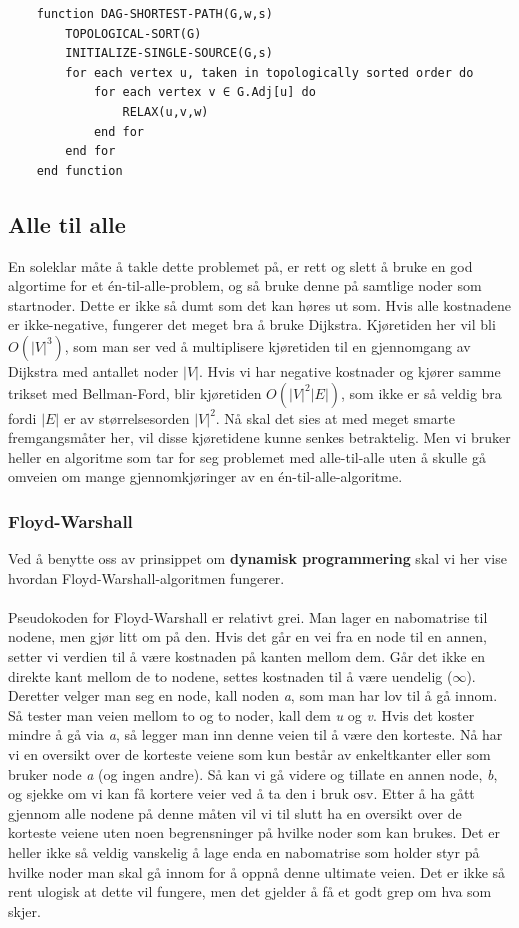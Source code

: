 \begin{lstlisting}
    function DAG-SHORTEST-PATH(G,w,s)
    	TOPOLOGICAL-SORT(G)
    	INITIALIZE-SINGLE-SOURCE(G,s)
    	for each vertex u, taken in topologically sorted order do
    		for each vertex v ∈ G.Adj[u] do
    			RELAX(u,v,w)
    		end for
    	end for
    end function

\end{lstlisting}

\subsection{Alle til alle}
En soleklar måte å takle dette problemet på, er rett og slett å bruke en god algortime for et én-til-alle-problem, og så bruke denne på samtlige noder som startnoder. Dette er ikke så dumt som det kan høres ut som. Hvis alle kostnadene er ikke-negative, fungerer det meget bra å bruke Dijkstra. Kjøretiden her vil bli $O(|V|^3)$, som man ser ved å multiplisere kjøretiden til en gjennomgang av Dijkstra med antallet noder $|V|$. Hvis vi har negative kostnader og kjører samme trikset med Bellman-Ford, blir kjøretiden $O(|V|^2 |E|)$, som ikke er så veldig bra fordi $|E|$ er av størrelsesorden $|V|^2$. Nå skal det sies at med meget smarte fremgangsmåter her, vil disse kjøretidene kunne senkes betraktelig. Men vi bruker heller en algoritme som tar for seg problemet med alle-til-alle uten å skulle gå omveien om mange gjennomkjøringer av en én-til-alle-algoritme.

\subsubsection{Floyd-Warshall}
Ved å benytte oss av prinsippet om \textbf{dynamisk programmering} skal vi her vise hvordan Floyd-Warshall-algoritmen fungerer.
\\\\
Pseudokoden for Floyd-Warshall er relativt grei. Man lager en nabomatrise til nodene, men gjør litt om på den. Hvis det går en vei fra en node til en annen, setter vi verdien til å være kostnaden på kanten mellom dem. Går det ikke en direkte kant mellom de to nodene, settes kostnaden til å være uendelig ($\infty$). Deretter velger man seg en node, kall noden \textit{a}, som man har lov til å gå innom. Så tester man veien mellom to og to noder, kall dem \textit{u} og \textit{v}. Hvis det koster mindre å gå via \textit{a}, så legger man inn denne veien til å være den korteste. Nå har vi en oversikt over de korteste veiene som kun består av enkeltkanter eller som bruker node \textit{a} (og ingen andre). Så kan vi gå videre og tillate en annen node, \textit{b}, og sjekke om vi kan få kortere veier ved å ta den i bruk osv. Etter å ha gått gjennom alle nodene på denne måten vil vi til slutt ha en oversikt over de korteste veiene uten noen begrensninger på hvilke noder som kan brukes. Det er heller ikke så veldig vanskelig å lage enda en nabomatrise som holder styr på hvilke noder man skal gå innom for å oppnå denne ultimate veien. Det er ikke så rent ulogisk at dette vil fungere, men det gjelder å få et godt grep om hva som skjer.


